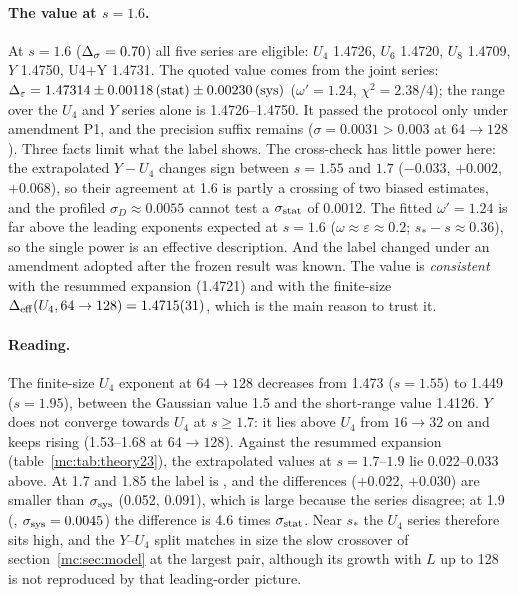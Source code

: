 \paragraph{The value at $s=1.6$.} At $s=1.6$ ($\Delta_\sigma=0.70$) all five series are eligible: $U_4$ 1.4726, $U_6$ 1.4720, $U_8$ 1.4709, $Y$ 1.4750, U4+Y
1.4731. The quoted value comes from the joint series: $\Delta_\varepsilon=1.47314\pm0.00118\,(\mathrm{stat})\pm0.00230\,(\mathrm{sys})$ ($\omega'=1.24$,
$\chi^2=2.38/4$); the range over the $U_4$ and $Y$ series alone is 1.4726--1.4750. It passed the protocol only under amendment P1, and the
precision suffix remains ($\sigma=0.0031>0.003$ at $64\to128$). Three facts limit what the label shows. The cross-check has little power here:
the extrapolated $Y-U_4$ changes sign between $s=1.55$ and $1.7$ ($-0.033$, $+0.002$, $+0.068$), so their agreement at 1.6 is partly a crossing of
two biased estimates, and the profiled $\sigma_D\approx0.0055$ cannot test a $\sigma_{\rm stat}$ of 0.0012. The fitted $\omega'=1.24$ is far above the
leading exponents expected at $s=1.6$ ($\omega\approx\varepsilon\approx0.2$; $s_*-s\approx0.36$), so the single power is an effective
description. And the label changed under an amendment adopted after the frozen result was known. The value is \emph{consistent} with the
resummed expansion (1.4721) and with the finite-size $\Delta_{\rm eff}(U_4,64\to128)=1.4715(31)$, which is the main reason to trust it.

\paragraph{Reading.} The finite-size $U_4$ exponent at $64\to128$ decreases from 1.473 ($s=1.55$) to 1.449 ($s=1.95$), between the Gaussian value
1.5 and the short-range value 1.4126. $Y$ does not converge towards $U_4$ at $s\ge1.7$: it lies above $U_4$ from $16\to32$ on and keeps rising
(1.53--1.68 at $64\to128$). Against the resummed expansion (table~\ref{mc:tab:theory23}), the extrapolated values at $s=1.7$--$1.9$ lie
$0.022$--$0.033$ above. At 1.7 and 1.85 the label is , and the differences ($+0.022$, $+0.030$) are smaller than $\sigma_{\rm sys}$
(0.052, 0.091), which is large because the series disagree; at 1.9 (, $\sigma_{\rm sys}=0.0045$) the difference is 4.6
times $\sigma_{\rm stat}$. Near $s_*$ the $U_4$ series therefore sits high, and the $Y$--$U_4$
split matches in size the slow crossover of section~\ref{mc:sec:model} at the largest pair, although its growth with $L$ up to 128 is not
reproduced by that leading-order picture.

